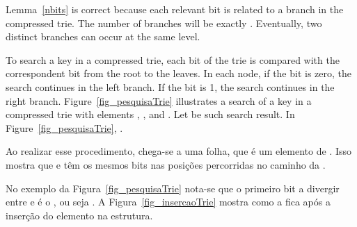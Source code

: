 \documentclass[11pt]{article}
\begin{document}
Lemma~\ref{nbits}  is correct because each relevant bit is related to a branch in the compressed trie. The number of branches will be exactly . Eventually, two distinct branches can occur at the same level.




To search a key  in a compressed trie, each bit of the trie is compared with the correspondent  bit from the root to the leaves. In each node, if the  bit is zero, the search continues in the left branch. If the bit is 1, the search continues in the right branch. Figure~\ref{fig_pesquisaTrie}  illustrates a search of a key  in a compressed trie with elements , ,  and . Let  be such search result. In Figure~\ref{fig_pesquisaTrie},  .





Ao realizar esse procedimento, chega-se a uma folha, que é um elemento  de . Isso  mostra que  e  têm os mesmos bits nas posições percorridas no caminho da .  





  No exemplo da Figura~\ref{fig_pesquisaTrie} nota-se que o primeiro bit a divergir entre  e  é o ,
  ou seja .
  A Figura~\ref{fig_insercaoTrie} mostra como a  fica após a inserção do elemento  na estrutura.
\end{document}
